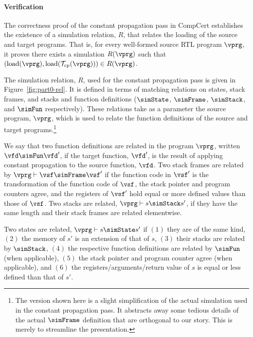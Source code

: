 % 




\paragraph{Verification}

The correctness proof of the constant propagation pass in CompCert establishes 
the existence of a simulation relation, $R$, that relates the loading of the source and target programs.
That is, for every well-formed source RTL program $\vprg$, it proves 
there exists a simulation $R(\vprg)$ such that 
$(\mathrm{load}(\vprg),\mathrm{load}(\mathcal{T}_\mathrm{cp}(\vprg)))\in R(\vprg)$.

The simulation relation, $R$, used for the constant propagation pass is given in
Figure~\ref{fig:part0-rel}.  It is defined in terms of matching relations on states, stack frames,
and stacks and function definitions ($\simState$, $\simFrame$, $\simStack$, and $\simFun$
respectively).  These relations take as a parameter the source program, $\vprg$, which is used to
relate the function definitions of the source and target programs.\footnote{The version shown here
  is a slight simplification of the actual simulation used in the constant propagation pass.  It
  abstracts away some tedious details of the actual $\simFrame$ definition that are orthogonal to
  our story.  This is merely to streamline the presentation.}

We say that two function definitions are related in the program $\vprg$, written $\vfd \simFun \vfd'$, 
if the target function, $\vfd'$, is the result of applying constant propagation to the source function, $\vfd$.
Two stack frames are related by $\vprg \vdash \vsf\simFrame \vsf'$ if 
the function code in $\vsf'$ is the transformation of the function code of $\vsf$,
the stack pointer and program counters agree, and
the registers of $\vsf'$ hold equal or more defined values than those of $\vsf$.
Two stacks are related, $\vprg \vdash s\simStack s'$, if they have the same length and their stack frames are related elementwise.

% 

Two states are related, $\vprg \vdash s \simState s'$
if $(1)$ they are of the same kind, 
$(2)$ the memory of $s'$ is an extension of that of $s$, 
$(3)$ their stacks are related by $\simStack$,
$(4)$ the respective function definitions are related by $\simFun$ (when applicable),
$(5)$ the stack pointer and program counter agree (when applicable), and
$(6)$ the registers/arguments/return value of $s$ is equal or less defined than that of $s'$. 

